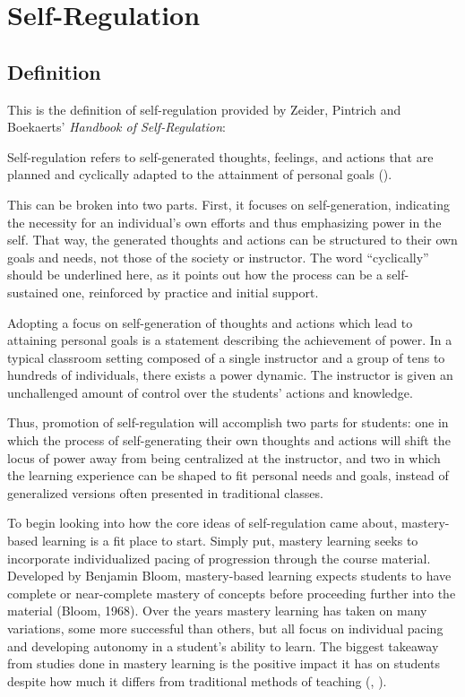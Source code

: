 \chapter{Self-Regulation}

\section{Definition}
This is the definition of self-regulation provided by Zeider, Pintrich and Boekaerts' \emph{Handbook of Self-Regulation}:
\begin{displayquote}
  Self-regulation refers to self-generated thoughts, feelings, and actions that are planned and cyclically adapted to the attainment of personal goals (\cite{zeider}).
\end{displayquote}

This can be broken into two parts. First, it focuses on self-generation, indicating the necessity for an individual's own efforts and thus emphasizing power in the self. That way, the generated thoughts and actions can be structured to their own goals and needs, not those of the society or instructor. The word ``cyclically'' should be underlined here, as it points out how the process can be a self-sustained one, reinforced by practice and initial support.

Adopting a focus on self-generation of thoughts and actions which lead to attaining personal goals is a statement describing the achievement of power. In a typical classroom setting composed of a single instructor and a group of tens to hundreds of individuals, there exists a power dynamic. The instructor is given an unchallenged amount of control over the students' actions and knowledge.

Thus, promotion of self-regulation will accomplish two parts for students: one in which the process of self-generating their own thoughts and actions will shift the locus of power away from being centralized at the instructor, and two in which the learning experience can be shaped to fit personal needs and goals, instead of generalized versions often presented in traditional classes.

To begin looking into how the core ideas of self-regulation came about, mastery-based learning is a fit place to start. Simply put, mastery learning seeks to incorporate individualized pacing of progression through the course material. Developed by Benjamin Bloom, mastery-based learning expects students to have complete or near-complete mastery of concepts before proceeding further into the material (Bloom, 1968). Over the years mastery learning has taken on many variations, some more successful than others, but all focus on individual pacing and developing autonomy in a student's ability to learn. The biggest takeaway from studies done in mastery learning is the positive impact it has on students despite how much it differs from traditional methods of teaching (\cite{zollinger_impact_2017}, \cite{bradley_evaluating_2017}).

